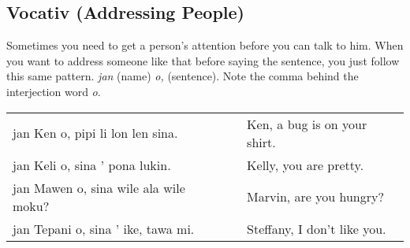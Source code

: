 \subsection*{Vocativ (Addressing People)}
%
%
Sometimes you need to get a person's attention before you can talk to him. 
When you want to address someone like that before saying the sentence, you just follow this same pattern. 
\textit{jan} (name) \textit{o,} (sentence). 
Note the comma behind the interjection word \textit{o}. 

\begin{supertabular}{p{5,5cm}|ll}
jan Ken o, pipi li lon len sina. && Ken, a bug is on your shirt. \\
jan Keli o, sina ' pona lukin. && Kelly, you are pretty. \\
jan Mawen o, sina wile ala wile moku? && Marvin, are you hungry? \\
jan Tepani o, sina ' ike, tawa mi. && Steffany, I don't like you. \\
\end{supertabular} 
%
